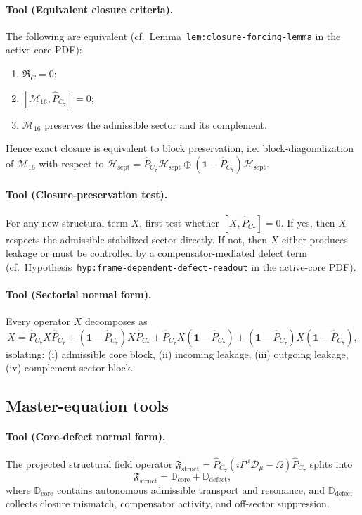 \documentclass[12pt,a4paper]{article}
\begin{document}
\paragraph{Tool (Equivalent closure criteria).}
The following are equivalent
(cf.\ Lemma~\texttt{lem:closure-forcing-lemma} in the active-core PDF):
\begin{enumerate}[label=(\roman*)]
 \item $\mathfrak{R}_C = 0$;
 \item $[\mathcal{M}_{16}, \hat{P}_{C_7}] = 0$;
 \item $\mathcal{M}_{16}$ preserves the admissible sector and its complement.
\end{enumerate}
Hence exact closure is equivalent to block preservation, i.e. block-diagonalization of $\mathcal{M}_{16}$ with respect to
$\mathcal{H}_{\mathrm{sept}} = \hat{P}_{C_7}\mathcal{H}_{\mathrm{sept}}
\oplus (\mathbf{1} - \hat{P}_{C_7})\mathcal{H}_{\mathrm{sept}}$.

\paragraph{Tool (Closure-preservation test).}
For any new structural term $X$, first test whether
$[X, \hat{P}_{C_7}] = 0$.
If yes, then $X$ respects the admissible stabilized sector directly.
If not, then $X$ either produces leakage or must be controlled by a
compensator-mediated defect term
(cf.\ Hypothesis~\texttt{hyp:frame-dependent-defect-readout} in the active-core PDF).

\paragraph{Tool (Sectorial normal form).}
Every operator $X$ decomposes as
\[
 X = \hat{P}_{C_7}X\hat{P}_{C_7}
 + (\mathbf{1}-\hat{P}_{C_7})X\hat{P}_{C_7}
 + \hat{P}_{C_7}X(\mathbf{1}-\hat{P}_{C_7})
 + (\mathbf{1}-\hat{P}_{C_7})X(\mathbf{1}-\hat{P}_{C_7}),
\]
isolating: (i) admissible core block, (ii) incoming leakage,
(iii) outgoing leakage, (iv) complement-sector block.

\subsection*{Master-equation tools}

\paragraph{Tool (Core-defect normal form).}
The projected structural field operator
$\mathfrak{F}_{\mathrm{struct}}
= \hat{P}_{C_7}(i\Gamma^\mu\mathcal{D}_\mu - \Omega)\hat{P}_{C_7}$
splits into
\[
 \mathfrak{F}_{\mathrm{struct}}
 = \mathbb{D}_{\mathrm{core}} + \mathbb{D}_{\mathrm{defect}},
\]
where $\mathbb{D}_{\mathrm{core}}$ contains autonomous admissible
transport and resonance, and $\mathbb{D}_{\mathrm{defect}}$ collects
closure mismatch, compensator activity, and off-sector suppression.
\end{document}
